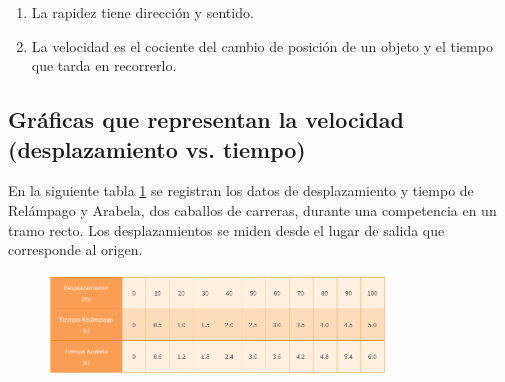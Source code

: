 \documentclass[11pt]{book}
\begin{document}
\begin{enumerate}
\begin{enumerate}
          \item La rapidez tiene dirección y sentido.\\
          \item La velocidad es el cociente del cambio de posición de un objeto y el tiempo que tarda en recorrerlo.\\
        \end{enumerate}

\end{enumerate}

\newpage
\subsection{Gr\'aficas que representan la velocidad (desplazamiento vs. tiempo)}
En la siguiente tabla \ref{tab:caballos_tabla} se registran los datos de desplazamiento y
tiempo de Relámpago y Arabela,
dos caballos de carreras, durante una competencia en un tramo recto.
Los desplazamientos se miden desde el lugar de salida que corresponde al origen.
\begin{figure}[H]
  \centering
  \includegraphics[width=0.8\textwidth]{caballos_tabla.png}
  \label{tab:caballos_tabla}
\end{figure}
\end{document}

